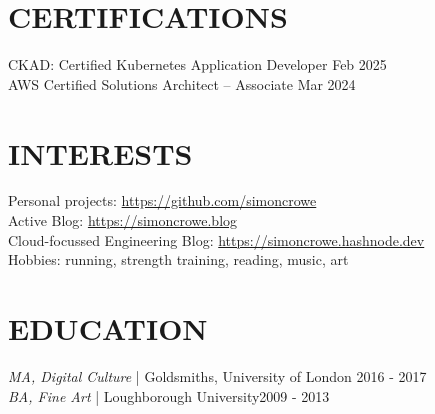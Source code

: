 \documentclass[line,margin]{res}
\begin{document}
\begin{resume}
\section{CERTIFICATIONS} CKAD: Certified Kubernetes Application Developer \hfill Feb 2025 \\
                         AWS Certified Solutions Architect -- Associate \hfill Mar 2024

\section{INTERESTS} Personal projects: \url{https://github.com/simoncrowe} \\
                    Active Blog: \url{https://simoncrowe.blog} \\
                    Cloud-focussed Engineering Blog: \url{https://simoncrowe.hashnode.dev} \\
                    Hobbies: running, strength training, reading, music, art

\section{EDUCATION} {\sl MA, Digital Culture} | Goldsmiths, University of London \hfill 2016 - 2017 \\
                    {\sl BA, Fine Art} | Loughborough University\hfill 2009 - 2013

\end{resume}
\end{document}
